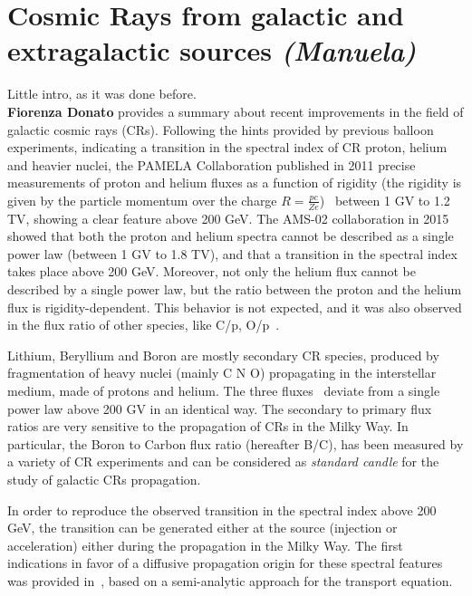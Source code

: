 \documentclass{PoS}
\begin{document}






\section{Cosmic Rays from galactic and extragalactic sources {\it (Manuela)}}
Little intro, as it was done before.\\
{\bf Fiorenza Donato} provides a summary about recent improvements in the field of galactic cosmic rays (CRs). Following the hints provided by previous balloon experiments, indicating a transition in the spectral index of CR 
proton, helium and heavier nuclei, the 
PAMELA Collaboration published in 2011
precise measurements of proton and helium fluxes as a function of rigidity (the rigidity is given by the particle momentum over the charge $R=\frac{pc}{Ze}$)~\cite{PAMELApHe} between 1 GV to 1.2 TV, showing a clear feature above 200 GeV. 
The AMS-02 collaboration in 2015~\cite{proton}~\cite{Aguilar:2015ctt} showed  
that both the proton and helium spectra
 cannot be described as a single power law (between 1 GV to 1.8 TV), and that
a transition in the spectral index takes place above 200 GeV.  Moreover, not only the helium flux cannot be described by a single power law, but the ratio
between the proton and the helium flux is rigidity-dependent. This behavior is not expected, and it was also observed in the flux ratio of other species,
like C/p, O/p~\cite{heco}. 

Lithium, Beryllium and Boron are mostly secondary CR species,
produced by fragmentation of heavy nuclei (mainly C N O) propagating in the interstellar medium, made of protons and helium. 
The three fluxes~\cite{libeb} deviate from a single power law above 200 GV in an identical way.
The  secondary to primary flux ratios are very sensitive to the propagation of CRs in the Milky Way. In particular, the Boron to Carbon flux ratio (hereafter B/C), has been measured by a variety of CR experiments and
can be considered as \textit{standard candle} for the study of galactic CRs propagation. 

In order to reproduce the observed transition in the spectral index above 200 GeV, the transition can be generated  either at the source (injection or acceleration) 
either during the propagation in the Milky Way. The first indications in favor of a diffusive propagation origin for these spectral features was provided in~\cite{Genolini:2017dfb}, based on a semi-analytic approach for the transport equation. 
\end{document}
